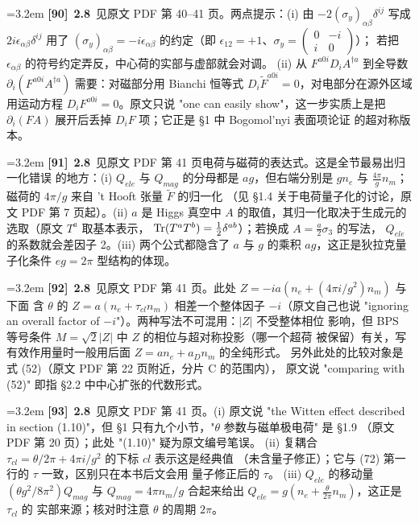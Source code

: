 \par
\par\medskip\noindent\hangindent=3.2em \textbf{[90]}~\textbf{2.8}~见原文 PDF 第 40--41 页。两点提示：(i) 由 $-2(\sigma_y)_{\alpha\beta}\delta^{ij}$ 写成 $2i\epsilon_{\alpha\beta}\delta^{ij}$ 用了 $(\sigma_y)_{\alpha\beta}=-i\epsilon_{\alpha\beta}$ 的约定（即 $\epsilon_{12}=+1$、$\sigma_y=\begin{pmatrix}0&-i\\ i&0\end{pmatrix}$）； 若把 $\epsilon_{\alpha\beta}$ 的符号约定弄反，中心荷的实部与虚部就会对调。 (ii) 从 $F^{a0i}D_iA^{\dagger a}$ 到全导数 $\partial_i(F^{a0i}A^{\dagger a})$ 需要：对磁部分用 Bianchi 恒等式 $D_i\widetilde F^{a0i}=0$，对电部分在源外区域 用运动方程 $D_iF^{a0i}=0$。原文只说 "one can easily show"，这一步实质上是把 $\partial_i(F A)$ 展开后丢掉 $D_iF$ 项；它正是 §1 中 Bogomol'nyi 表面项论证 的超对称版本。
\par
\par\medskip\noindent\hangindent=3.2em \textbf{[91]}~\textbf{2.8}~见原文 PDF 第 41 页电荷与磁荷的表达式。这是全节最易出归一化错误 的地方：(i) $Q_{ele}$ 与 $Q_{mag}$ 的分母都是 $ag$，但右端分别是 $gn_e$ 与 $\frac{4\pi}{g}n_m$；磁荷的 $4\pi/g$ 来自 't Hooft 张量 $\widetilde F$ 的归一化 （见 §1.4 关于电荷量子化的讨论，原文 PDF 第 7 页起）。(ii) $a$ 是 Higgs 真空中 $A$ 的取值，其归一化取决于生成元的选取（原文 $T^a$ 取基本表示， ${\rm Tr}(T^aT^b)=\frac12\delta^{ab}$）；若换成 $A=\frac a2\sigma_3$ 的写法， $Q_{ele}$ 的系数就会差因子 2。(iii) 两个公式都隐含了 $a$ 与 $g$ 的乘积 $ag$，这正是狄拉克量子化条件 $eg=2\pi$ 型结构的体现。
\par
\par\medskip\noindent\hangindent=3.2em \textbf{[92]}~\textbf{2.8}~见原文 PDF 第 41 页。此处 $Z=-ia(n_e+(4\pi i/g^2)n_m)$ 与下面 含 $\theta$ 的 $Z=a(n_e+\tau_{cl}n_m)$ 相差一个整体因子 $-i$（原文自己也说 "ignoring an overall factor of $-i$"）。两种写法不可混用：$|Z|$ 不受整体相位 影响，但 BPS 等号条件 $M=\sqrt2|Z|$ 中 $Z$ 的相位与超对称投影（哪一个超荷 被保留）有关，写有效作用量时一般用后面 $Z=an_e+a_Dn_m$ 的全纯形式。 另外此处的比较对象是式 (52)（原文 PDF 第 22 页附近，分片 C 的范围内）， 原文说 "comparing with (52)" 即指 §2.2 中中心扩张的代数形式。
\par
\par\medskip\noindent\hangindent=3.2em \textbf{[93]}~\textbf{2.8}~见原文 PDF 第 41 页。(i) 原文说 "the Witten effect described in section (1.10)"，但 §1 只有九个小节，"$\theta$ 参数与磁单极电荷" 是 §1.9 （原文 PDF 第 20 页）；此处 "(1.10)" 疑为原文编号笔误。 (ii) 复耦合 $\tau_{cl}=\theta/2\pi+4\pi i/g^2$ 的下标 $cl$ 表示这是经典值 （未含量子修正）；它与 (72) 第一行的 $\tau$ 一致，区别只在本书后文会用 量子修正后的 $\tau$。 (iii) $Q_{ele}$ 的移动量 $(\theta g^2/8\pi^2)Q_{mag}$ 与 $Q_{mag}=4\pi n_m/g$ 合起来给出 $Q_{ele}=g(n_e+\frac{\theta}{2\pi}n_m)$，这正是 $\tau_{cl}$ 的 实部来源；核对时注意 $\theta$ 的周期 $2\pi$。
